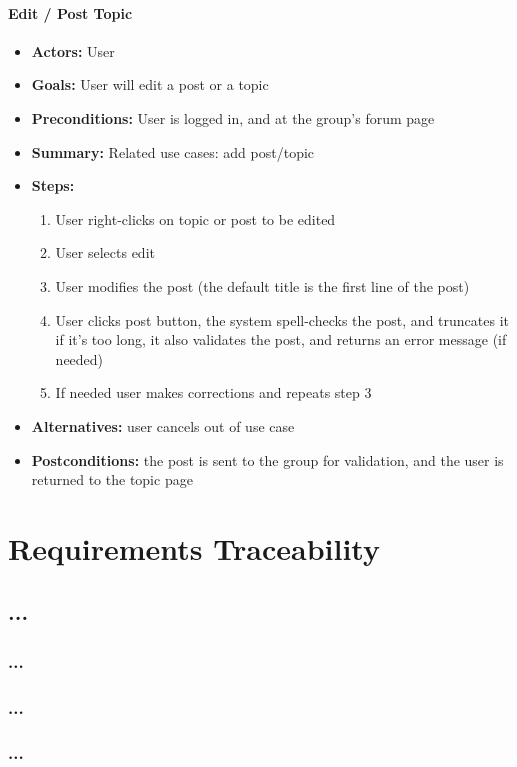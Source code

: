 \documentclass[12pt, oneside, letterpaper]{report}
\begin{document}
			\subsubsection{Edit / Post Topic}
			\begin{itemize}
				\item{\textbf{Actors:} User}
				\item{\textbf{Goals:} User will edit a post or a topic}
				\item{\textbf{Preconditions:} User is logged in, and at the group's forum page}
				\item{\textbf{Summary:} Related use cases: add post/topic}
				\item{\textbf{Steps:}
				\begin{enumerate}
					\item{User right-clicks on topic or post to be edited}
					\item{User selects edit}
					\item{User modifies the post (the default title is the first line of the post)}
					\item{User clicks post button, the system spell-checks the post, and truncates it if it's too long, it also validates the post, and returns an error message (if needed)}
					\item{If needed user makes corrections and repeats step 3}
				\end{enumerate}
				}
				\item{\textbf{Alternatives:} user cancels out of use case}
				\item{\textbf{Postconditions:} the post is sent to the group for validation, and the user is returned to the topic page}
			\end{itemize}


\chapter{Requirements Traceability}
		\section{...}
			\subsection{...}
			\subsection{...}
			\subsection{...}
\end{document}
